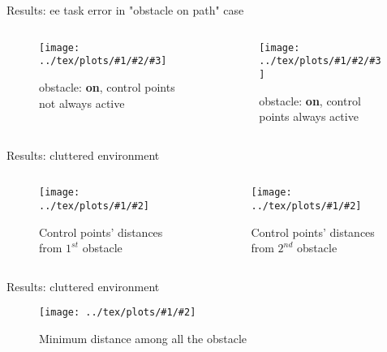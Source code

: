\documentclass[11pt]{beamer}
\newcommand{\imgG}[3]{\texttt{[image: ../tex/plots/\#1/\#2]}}
\newcommand{\img}[4]{\texttt{[image: ../tex/plots/\#1/\#2/\#3]}}
\begin{document}
\begin{frame}{Results: ee task error in "obstacle on path" case}
\begin{columns}
\begin{column}{.5\textwidth}
\begin{figure}[H]
\img{on}{notAlways}{ee_task_error.eps}{.4}
\caption{obstacle: \textbf{on}, control points not always active}
\end{figure}
\end{column}
\begin{column}{.5\textwidth}
\begin{figure}[H]
\img{on}{always}{ee_task_error.eps}{.4}
\caption{obstacle: \textbf{on}, control points always active}
\end{figure}
\end{column}
\end{columns}
\end{frame}

\begin{frame}{Results: cluttered environment}
\begin{columns}
\begin{column}{.5\textwidth}
\begin{figure}[H]
\label{3obstDist}
\imgG{2obs}{control_points_distances.eps}{.4}
\caption{Control points' distances from $1^{st}$ obstacle}
\end{figure}
\end{column}
\begin{column}{.5\textwidth}
\begin{figure}[H]
\imgG{2obs}{control_points_distances_2.eps}{.4}
\caption{Control points' distances from $2^{nd}$ obstacle}
\end{figure}
\end{column}
\end{columns}
\end{frame}

\begin{frame}{Results: cluttered environment}
\begin{figure}[H]
\imgG{2obs}{min_2.eps}{.5}
\caption{Minimum distance among all the obstacle}
\end{figure}
\end{frame}
\end{document}
